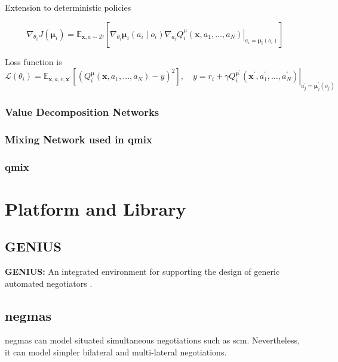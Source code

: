 Extension to deterministic policies

\begin{equation}
\nabla_{\theta_{i}} J\left(\boldsymbol{\mu}_{i}\right)=\mathbb{E}_{\mathbf{x}, a \sim \mathcal{D}}\left[\left.\nabla_{\theta_{i}} \boldsymbol{\mu}_{i}\left(a_{i} \mid o_{i}\right) \nabla_{a_{i}} Q_{i}^{\mu}\left(\mathbf{x}, a_{1}, \ldots, a_{N}\right)\right|_{a_{i}=\boldsymbol{\mu}_{i}\left(o_{i}\right)}\right]
\end{equation}

Loss function is 
\begin{equation}
\mathcal{L}\left(\theta_{i}\right)=\mathbb{E}_{\mathbf{x}, a, r, \mathbf{x}^{\prime}}\left[\left(Q_{i}^{\boldsymbol{\mu}}\left(\mathbf{x}, a_{1}, \ldots, a_{N}\right)-y\right)^{2}\right], \quad y=r_{i}+\left.\gamma Q_{i}^{\boldsymbol{\mu}^{\prime}}\left(\mathbf{x}^{\prime}, a_{1}^{\prime}, \ldots, a_{N}^{\prime}\right)\right|_{a_{j}^{\prime}=\boldsymbol{\mu}_{j}^{\prime}\left(o_{j}\right)}
\end{equation}

\subsubsection{Value Decomposition Networks}

\subsubsection{Mixing Network used in \gls{qmix}}

\subsubsection{\gls{qmix}}

\section{Platform and Library}
\subsection{GENIUS}
\textbf{GENIUS:} An integrated environment for supporting the design of generic automated negotiators \parencite{Lin2014}.

\subsection{\gls{negmas}} \label{background:negmas}
\gls{negmas} can model situated simultaneous negotiations such as \gls{scm}. Nevertheless, it can model simpler bilateral and multi-lateral negotiations.

